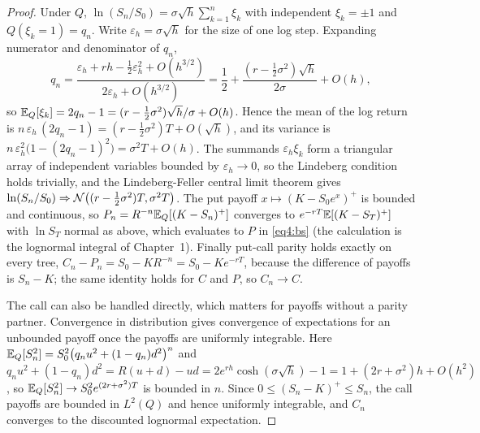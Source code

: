 \begin{chapterrefs}
\begin{proof}
Under $Q$, $\ln(S_n/S_0)=\sigma\sqrt h\sum_{k=1}^n\xi_k$ with independent $\xi_k=\pm1$ and
$Q(\xi_k=1)=q_n$. Write $\varepsilon_h=\sigma\sqrt h$ for the size of one log step. Expanding numerator and denominator of $q_n$,
\begin{equation*}
  q_n=\frac{\varepsilon_h+rh-\tfrac12\varepsilon_h^2+O(h^{3/2})}{2\varepsilon_h+O(h^{3/2})}=\frac12+\frac{(r-\tfrac12\sigma^2)\sqrt h}{2\sigma}+O(h),
\end{equation*}
so $\mathbb{E}_Q[\xi_k]=2q_n-1=(r-\tfrac12\sigma^2)\sqrt h/\sigma+O(h)$. Hence the mean of the log return is
$n\,\varepsilon_h\,(2q_n-1)=(r-\tfrac12\sigma^2)T+O(\sqrt h)$, and its variance is $n\,\varepsilon_h^2\bigl(1-(2q_n-1)^2\bigr)=\sigma^2T+O(h)$.
The summands $\varepsilon_h\xi_k$ form a triangular array of independent variables bounded by $\varepsilon_h\to0$, so the
Lindeberg condition holds trivially, and the Lindeberg-Feller central limit theorem gives
$\ln(S_n/S_0)\Rightarrow\mathcal{N}\bigl((r-\tfrac12\sigma^2)T,\sigma^2T\bigr)$. The put payoff
$x\mapsto(K-S_0e^x)^+$ is bounded and continuous, so $P_n=R^{-n}\mathbb{E}_Q[(K-S_n)^+]$ converges to
$e^{-rT}\mathbb{E}[(K-S_T)^+]$ with $\ln S_T$ normal as above, which evaluates to $P$ in \cref{eq4:bs} (the
calculation is the lognormal integral of Chapter~1). Finally put-call parity holds exactly on every
tree, $C_n-P_n=S_0-KR^{-n}=S_0-Ke^{-rT}$, because the difference of payoffs is $S_n-K$; the same identity
holds for $C$ and $P$, so $C_n\to C$.

The call can also be handled directly, which matters for payoffs without a parity partner.
Convergence in distribution gives convergence of expectations for an unbounded payoff once the payoffs
are uniformly integrable. Here $\mathbb{E}_Q[S_n^2]=S_0^2\bigl(q_nu^2+(1-q_n)d^2\bigr)^n$ and
$q_nu^2+(1-q_n)d^2=R(u+d)-ud=2e^{rh}\cosh(\sigma\sqrt h)-1=1+(2r+\sigma^2)h+O(h^2)$, so
$\mathbb{E}_Q[S_n^2]\to S_0^2e^{(2r+\sigma^2)T}$ is bounded in $n$. Since $0\le(S_n-K)^+\le S_n$, the call
payoffs are bounded in $L^2(Q)$ and hence uniformly integrable, and $C_n$ converges to the discounted
lognormal expectation.
\end{proof}


\end{chapterrefs}
